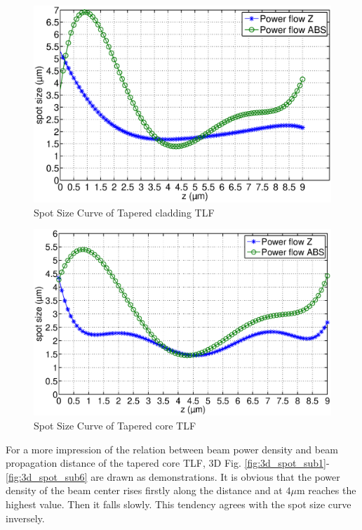 \begin{figure}[!ht]
		\centering
		\includegraphics[width=0.7 \textwidth]{bilder/Tapered_cladding_spot_curve}
		\caption{Spot Size Curve of Tapered cladding TLF}
		\label{fig:Tapered_cladding_spot_curve}
\end{figure} 
\begin{figure}[!ht]
		\centering
		\includegraphics[width=0.7 \textwidth]{bilder/Tapered_core_spot_curve}
		\caption{Spot Size Curve of Tapered core TLF}
 		\label{fig:Tapered_core_spot_curve}	
\end{figure}
For a more impression of the relation between beam power density and beam propagation distance of the tapered core TLF, 3D Fig. \ref{fig:3d_spot_sub1}-\ref{fig:3d_spot_sub6} are drawn as demonstrations. It is obvious that the power density of the beam center rises firstly along the distance and at $4\mu$m reaches the highest value. Then it falls slowly. This tendency agrees with the spot size curve inversely. \\

